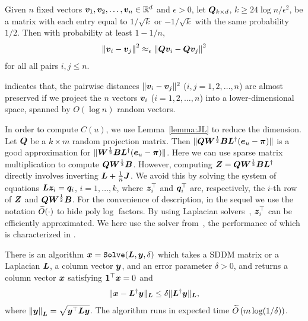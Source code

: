 \documentclass[10pt,twocolumn,twoside]{IEEEtran}
\begin{document}
\begin{lemma}
    \label{lemma:JL}
    Given $n$ fixed vectors \(\boldsymbol{v}_1,\boldsymbol{v}_2,\ldots,\boldsymbol{v}_n\in \mathbb{R}^d\) and
    \(\epsilon>0\), let
    \(\boldsymbol{Q}_{k\times d}\),  \(k\ge 24\log n/\epsilon^2\), be a matrix with each  entry equal  to \(1/\sqrt{k}\) or \(- 1/\sqrt{k}\)  with the same probability \(1/2\). Then with probability at least \(1-1/n\),
    \begin{equation*}
        \left\Vert\boldsymbol{v}_i-\boldsymbol{v}_j\right\Vert^2\approx_\epsilon\left\Vert\boldsymbol{Q}\boldsymbol{v}_i-\boldsymbol{Q}\boldsymbol{v}_j\right\Vert^2
    \end{equation*}
    for all all pairs  \(i,j\le n\).
\end{lemma}

 indicates that,  the pairwise distances \(\|\boldsymbol{v}_i-\boldsymbol{v}_j\|^2\) (\(i,j=1,2,\ldots, n\)) are almost preserved if we project the \(n\) vectors \(\boldsymbol{v}_i\) (\(i=1,2,\ldots, n\))  into a lower-dimensional space, spanned
by \(O(\log n)\) random vectors.

In order to compute  \(C(u)\), we use Lemma~\ref{lemma:JL} to reduce the dimension. Let \(\boldsymbol{Q}\) be a \(k\times m\) random projection matrix. Then  \(\|\boldsymbol{Q} \boldsymbol{W}^{\frac{1}{2}} \boldsymbol{B} \boldsymbol{L}^{\dagger}(\boldsymbol{e}_u-\boldsymbol{\pi})\|\) is a good approximation for \(\|\boldsymbol{W}^{\frac{1}{2}} \boldsymbol{B} \boldsymbol{L}^{\dagger} (\boldsymbol{e}_u - \boldsymbol{\pi})\|\). Here we can use sparse matrix multiplication to compute \(\boldsymbol{Q} \boldsymbol{W}^{\frac{1}{2}} \boldsymbol{B}\). However, computing \(\boldsymbol{Z}=\boldsymbol{Q} \boldsymbol{W}^{\frac{1}{2}} \boldsymbol{B} \boldsymbol{L}^{\dagger}\) directly involves inverting \(\boldsymbol{L}+\frac{1}{n}\boldsymbol{J}\). We avoid this by solving the system of equations \(\boldsymbol{L} \boldsymbol{z}_i=\boldsymbol{q}_i\), \(i=1,\ldots,k\), where  \(\boldsymbol{z}^\top_i\) and \(\boldsymbol{q}^\top_i\) are, respectively, the \(i\)-th row of \(\boldsymbol{Z}\) and \(\boldsymbol{Q} \boldsymbol{W}^{\frac{1}{2}} \boldsymbol{B}\). For the convenience  of description, in the sequel we use the notation \(\widetilde{O}(\cdot)\) to hide \(\mathrm{poly} \log \) factors. By using Laplacian solvers~\cite{SpTe04,Sp10,KoMiPe11,LiBr12,CoKyMiPaPeRaSu14,KySa16}, \(\boldsymbol{z}^\top _i\) can be efficiently approximated.  We here use the  solver from~\cite{CoKyMiPaPeRaSu14}, the performance of which is characterized in .

\begin{lemma}
    \label{lemma:ST}
    There is an algorithm \(\boldsymbol{x} = \mathtt{Solve}(\boldsymbol{L},\boldsymbol{y},\delta)\) which
    takes a SDDM matrix or a Laplacian \(\boldsymbol{L}\),
    a column vector \(\boldsymbol{y}\), and an error
    parameter \(\delta > 0\), and returns a column vector \(\boldsymbol{x}\) satisfying  \(\boldsymbol{1}^\top\boldsymbol{x} = 0\) and
    \[
        \|\boldsymbol{x} - \boldsymbol{L}^{\dagger} \boldsymbol{y}\|_{\boldsymbol{L}} \leq \delta \|\boldsymbol{L}^{\dagger} \boldsymbol{y}\|_{\boldsymbol{L}},
    \]
    where \(\left\Vert\boldsymbol{y}\right\Vert_{\boldsymbol{L}} = \sqrt{\boldsymbol{y}^{\top} \boldsymbol{L} \boldsymbol{y}}\).
    The algorithm runs in expected time \(\widetilde{O} \left(m \log(1/\delta) \right)\).
\end{lemma}
\end{document}
